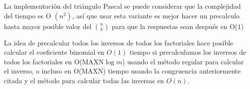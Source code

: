 La implementación del triángulo Pascal se puede considerar que la complejidad del tiempo es O $(n^2)$, así que usar esta variante es mejor hacer un precalculo hasta mayor posible valor del $\binom{n}{k}$ para que la respuestas sean después en O($1$)

La idea de precalcular todos los inversos de todos los factoriales hace posible calcular el 
coeficiente binomial en $O(1)$ tiempo si precalculamos los inversos de todos los factoriales en 
O($\text{MAXN} \log m$) usando el método regular para calcular el inverso, o incluso en
O($\text{MAXN}$) tiempo usando la congruencia anteriormente citada y el método para calcular todas las inversas en $O(n)$.